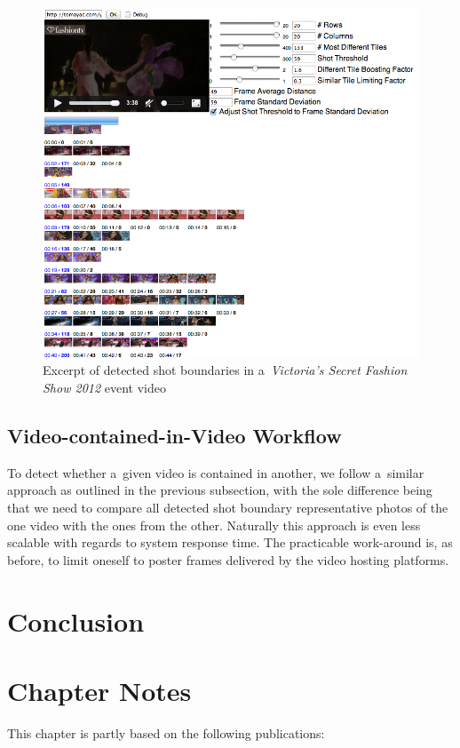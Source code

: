 \begin{figure}[h!]
  \centering
  \includegraphics[width=1.0\linewidth]{./vsfashionshowboundaries.png}
  \caption[Excerpt of detected shot boundaries in an event video]
  {Excerpt of detected shot boundaries in a~\emph{Victoria's Secret Fashion Show 2012} event video}
  \label{fig:vsfashionshowboundaries}
\end{figure}

\subsection{Video-contained-in-Video Workflow}

To detect whether a~given video is contained in another,
we follow a~similar approach as outlined in the previous subsection,
with the sole difference being that we need to compare
all detected shot boundary representative photos of the one video
with the ones from the other.
Naturally this approach is even less scalable
with regards to system response time.
The practicable work-around is, as before, to limit oneself
to poster frames delivered by the video hosting platforms.

\section{Conclusion}

\section*{Chapter Notes}
This chapter is partly based on the following publications:
